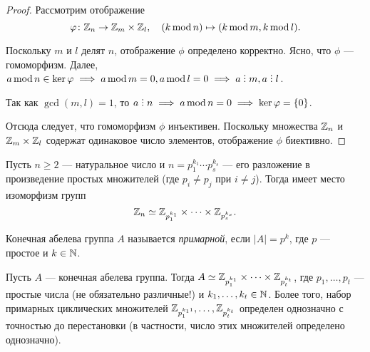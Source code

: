 \begin{proof}
    Рассмотрим отображение
    \begin{equation*}
        \varphi \colon \mathbb{Z}_n \to \mathbb{Z}_m \times \mathbb{Z}_l, \quad (k \mathop{\mathrm{mod}} {n}) \mapsto (k \mathop{\mathrm{mod}} m, k \mathop{\mathrm{mod}} l)
    .\end{equation*}

    Поскольку $m$ и $l$ делят $n$, отображение $\phi$ определено корректно. Ясно, что $\phi$ --- гомоморфизм. Далее, $a \mathop{\mathrm{mod}} n \in \ker \phi \implies a \mathop{\mathrm{mod}} m = 0, a \mathop{\mathrm{mod}} l = 0 \implies a \divby m,a \divby l$.

    Так как $\gcd(m, l) = 1$, то $a \divby n \implies a \mathop{\mathrm{mod}} n = 0 \implies \ker \phi = \{0\}$.

    Отсюда следует, что гомоморфизм $\phi$ инъективен. Поскольку множества $\mathbb{Z}_n$ и $\mathbb{Z}_m \times \mathbb{Z}_l$ содержат одинаковое число элементов, отображение $\phi$ биективно.
\end{proof}

\begin{corollary}
    Пусть $n \geq 2$ --- натуральное число и $n = p_1^{k_1} \cdots p_s^{k_s}$ --- его разложение в произведение простых множителей (где $p_i \neq p_j$ при $i \neq j$). Тогда имеет место изоморфизм групп
    \begin{equation*}
        \mathbb{Z}_n \simeq \mathbb{Z}_{p_1^{k_1}} \times \dots \times \mathbb{Z}_{p_s^{k_s}} 
    .\end{equation*}
\end{corollary}

\begin{definition}
    Конечная абелева группа $A$ называется \textit{примарной}, если $\left|A\right| = p^{k}$, где $p$ --- простое и $k \in \mathbb{N}$.
\end{definition}

\begin{theorem}
    Пусть $A$ --- конечная абелева группа. Тогда $A \simeq \mathbb{Z}_{p_1^{k_1}} \times \dots \times \mathbb{Z}_{p_t^{k_t}}$, где $p_1, \dots, p_t$ --- простые числа (не обязательно различные!) и $k_1, \dots, k_t \in \mathbb{N}$. Более того, набор примарных циклических множителей $\mathbb{Z}_{p_1^{k_11}}, \dots, \mathbb{Z}_{p_t^{k_t}}$ определен однозначно с точностью до перестановки (в частности, число этих множителей определено однозначно). 
\end{theorem}
